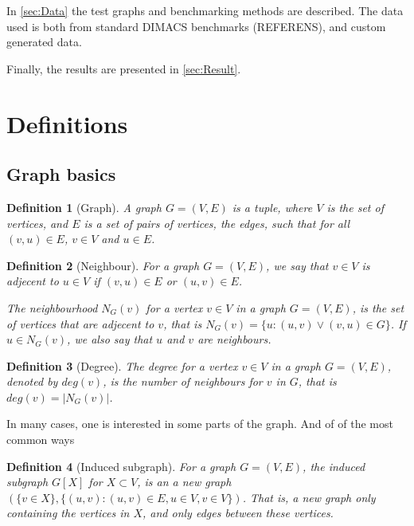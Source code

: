 \documentclass{amsart}
\newtheorem{definition}{Definition}[section]
\begin{document}
In \autoref{sec:Data} the test graphs and benchmarking methods are described. The data
used is both from standard DIMACS benchmarks (REFERENS), and custom generated data.

Finally, the results are presented in \autoref{sec:Result}.

\section{Definitions}
\label{sec:Definitions}

\subsection{Graph basics}
\label{sec:GraphBasics}

\begin{definition}[Graph]
    A graph $G = (V,E)$ is a tuple, where $V$ is the set of vertices, and $E$ is
    a set of pairs of vertices, the edges, such that for all $(v,u) \in E$,
    $v \in V$ and $u \in E$.
\end{definition}
\begin{definition}[Neighbour]
    For a graph $G = (V,E)$, we say that $v \in V$ is adjecent to 
    $u \in V$ if $(v,u) \in E$ or $(u,v) \in E$. 

    The neighbourhood $N_G(v)$ for a vertex $v \in V$ in a graph $G = (V,E)$,
    is the set of vertices that are adjecent to $v$, that is 
    $N_G(v) = \{u : (u,v) \vee (v,u) \in G\}$. If $u \in N_G(v)$, we also say
    that $u$ and $v$ are neighbours.
\end{definition}

\begin{definition}[Degree]
    The degree for a vertex $v \in V$ in a graph $G = (V,E)$, denoted by 
    $deg(v)$, is the number of neighbours for $v$ in $G$, that is 
    $deg(v) = |N_G(v)|$.

\end{definition}

In many cases, one is interested in some parts of the graph. And of of the most
common ways 

\begin{definition}[Induced subgraph]
    
    For a graph $G = (V,E)$, the induced subgraph $G[X]$ for $X \subset V$, is
    an a new graph $(\{v \in X\},\{(u,v) : (u,v) \in E, u \in V,v \in V\})$. That
    is, a new graph only containing the vertices in $X$, and only edges between
    these vertices.

\end{definition}
\end{document}
